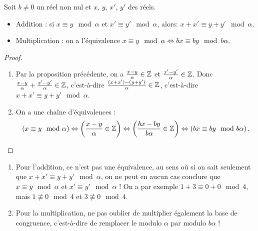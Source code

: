 \begin{proposition}
Soit $b\neq 0$ un réel non nul et $x$, $y$, $x'$, $y'$ des réels.
\begin{itemize}
\item Addition : si $x \equiv y\mod \alpha$ et $x' \equiv y'\mod \alpha$, alors: $x+x' \equiv y+y'\mod \alpha$.
\item Multiplication : on a l'équivalence $x \equiv y\mod \alpha \iff bx\equiv by \mod{b\alpha}$. 
\end{itemize}
\end{proposition}
\begin{proof}
\begin{enumerate}
\item Par la proposition précédente, on a $\frac{x-y}{\alpha} \in \mathbb{Z}$ et $\frac{x'-y'}{\alpha} \in \mathbb{Z}$. Donc $\frac{x-y}{\alpha}+\frac{x'-y'}{\alpha} \in \mathbb{Z}$, c'est-à-dire  $\frac{(x+x')-(y+y')}{\alpha} \in \mathbb{Z}$, c'est-à-dire $x+x' \equiv y+y' \mod \alpha$.
\item On a une chaîne d'équivalences : 
\[\left(x\equiv y\mod \alpha\right) \Leftrightarrow  \left(\frac{x-y}{\alpha} \in \mathbb{Z}\right) \Leftrightarrow \left(\frac{bx-by}{b\alpha} \in \mathbb{Z}\right) \Leftrightarrow \left(bx\equiv by\mod b\alpha\right).\]
\end{enumerate}
\end{proof}

\begin{attention}
\begin{enumerate}
\item Pour l'addition, ce n'est pas une équivalence, au sens où si on sait seulement que $x+x' \equiv y+y'\mod \alpha$, on ne peut en aucun cas conclure que $x \equiv y\mod \alpha$ et $x' \equiv y'\mod \alpha$ ! On a par exemple $1+3\equiv 0+0 \mod 4$, mais $1\not\equiv 0 \mod 4$ et $3\not\equiv 0 \mod 4$. 
\item Pour la multiplication, ne pas oublier de multiplier également la base de congruence, c'est-à-dire de remplacer le modulo $\alpha$ par modulo $b\alpha$ ! 
\end{enumerate}
\end{attention}

